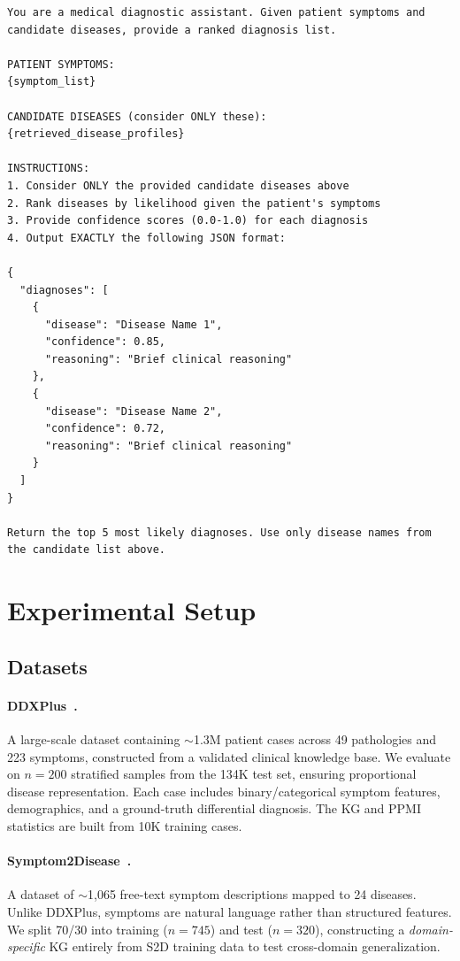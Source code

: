 \documentclass[preprint,12pt]{elsarticle}
\begin{document}
\begin{lstlisting}[basicstyle=\footnotesize\ttfamily, breaklines=true, frame=single]
You are a medical diagnostic assistant. Given patient symptoms and candidate diseases, provide a ranked diagnosis list.

PATIENT SYMPTOMS:
{symptom_list}

CANDIDATE DISEASES (consider ONLY these):
{retrieved_disease_profiles}

INSTRUCTIONS:
1. Consider ONLY the provided candidate diseases above
2. Rank diseases by likelihood given the patient's symptoms
3. Provide confidence scores (0.0-1.0) for each diagnosis
4. Output EXACTLY the following JSON format:

{
  "diagnoses": [
    {
      "disease": "Disease Name 1",
      "confidence": 0.85,
      "reasoning": "Brief clinical reasoning"
    },
    {
      "disease": "Disease Name 2", 
      "confidence": 0.72,
      "reasoning": "Brief clinical reasoning"
    }
  ]
}

Return the top 5 most likely diagnoses. Use only disease names from the candidate list above.
\end{lstlisting}

\section{Experimental Setup}
\label{sec:experiments}

\subsection{Datasets}

\paragraph{DDXPlus~\cite{fansi2022ddxplus}.} A large-scale dataset containing ${\sim}$1.3M patient cases across 49 pathologies and 223 symptoms, constructed from a validated clinical knowledge base. We evaluate on $n{=}200$ stratified samples from the 134K test set, ensuring proportional disease representation. Each case includes binary/categorical symptom features, demographics, and a ground-truth differential diagnosis. The KG and PPMI statistics are built from 10K training cases.

\paragraph{Symptom2Disease~\cite{gretelai_s2d}.} A dataset of ${\sim}$1,065 free-text symptom descriptions mapped to 24 diseases. Unlike DDXPlus, symptoms are natural language rather than structured features. We split 70/30 into training ($n{=}745$) and test ($n{=}320$), constructing a \emph{domain-specific} KG entirely from S2D training data to test cross-domain generalization.
\end{document}
